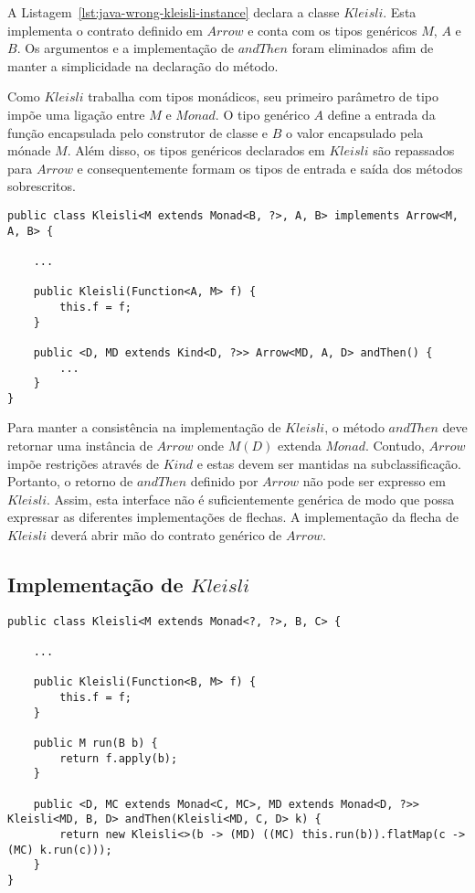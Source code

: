 \documentclass[10pt, conference]{IEEEtran}
\begin{document}
A Listagem~\ref{lst:java-wrong-kleisli-instance} declara a classe $Kleisli$. Esta implementa o contrato definido em $Arrow$ e conta com os tipos genéricos $M$, $A$ e $B$. Os argumentos e a implementação de $andThen$ foram eliminados afim de manter a simplicidade na declaração do método.


Como $Kleisli$ trabalha com tipos monádicos, seu primeiro parâmetro de tipo impõe uma ligação entre $M$ e $Monad$. O tipo genérico $A$ define a entrada da função encapsulada pelo construtor de classe e $B$ o valor encapsulado pela mónade $M$. Além disso, os tipos genéricos declarados em $Kleisli$ são repassados para $Arrow$ e consequentemente formam os tipos de entrada e saída dos métodos sobrescritos.

\begin{lstlisting}[caption = {Implementação concreta da interface $Arrow$}, label = {lst:java-wrong-kleisli-instance}]
public class Kleisli<M extends Monad<B, ?>, A, B> implements Arrow<M, A, B> {

	...

	public Kleisli(Function<A, M> f) {
        this.f = f;
	}

	public <D, MD extends Kind<D, ?>> Arrow<MD, A, D> andThen() {
		...
	}
}
\end{lstlisting}

Para manter a consistência na implementação de $Kleisli$, o método $andThen$ deve retornar uma instância de $Arrow$ onde $M(D)$ extenda $Monad$. Contudo, $Arrow$ impõe restrições através de $Kind$ e estas devem ser mantidas na subclassificação. Portanto, o retorno de $andThen$ definido por $Arrow$ não pode ser expresso em $Kleisli$. Assim, esta interface não é suficientemente genérica de modo que possa expressar as diferentes implementações de flechas. A implementação da flecha de $Kleisli$ deverá abrir mão do contrato genérico de $Arrow$.

\subsection{Implementação de $Kleisli$}

\begin{lstlisting}[float = *, caption = {Implementação de $Kleisli$}, label = {lst:java-right-kleisli-instance}]
public class Kleisli<M extends Monad<?, ?>, B, C> {

	...

	public Kleisli(Function<B, M> f) {
		this.f = f;
	}

	public M run(B b) {
		return f.apply(b);
	}

	public <D, MC extends Monad<C, MC>, MD extends Monad<D, ?>> Kleisli<MD, B, D> andThen(Kleisli<MD, C, D> k) {
		return new Kleisli<>(b -> (MD) ((MC) this.run(b)).flatMap(c -> (MC) k.run(c)));
	}
}
\end{lstlisting}
\end{document}
